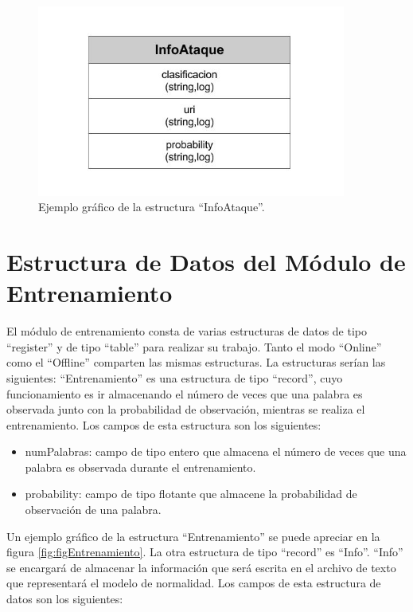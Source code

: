 \begin{figure}[!htb]
\begin{center}
\includegraphics[width=4in]{./img/InfoAtaque.jpg}
\caption{Ejemplo gráfico de la estructura ``InfoAtaque''.}
\label{fig:InfoAtaque}
\end{center}
\end{figure}	



\section{Estructura de Datos del Módulo de Entrenamiento}
El módulo de entrenamiento consta de varias estructuras de datos de
tipo ``register'' y de tipo ``table'' para realizar su trabajo. Tanto el modo
``Online'' como el ``Offline'' comparten las mismas estructuras.
La estructuras serían las siguientes:
``Entrenamiento'' es una estructura de tipo ``record'', cuyo funcionamiento es ir almacenando el número de veces que una palabra es observada junto con la probabilidad de observación, mientras se realiza el entrenamiento. Los
campos de esta estructura son los siguientes:

\begin{itemize}
\item numPalabras: campo de tipo entero que almacena el número de veces
que una palabra es observada durante el entrenamiento.
\item probability: campo de tipo flotante que almacene la probabilidad de observación de una palabra.
\end{itemize}

Un ejemplo gráfico de la estructura ``Entrenamiento'' se puede apreciar
en la figura \ref{fig:figEntrenamiento}.
La otra estructura de tipo ``record'' es ``Info''. ``Info'' se encargará de
almacenar la información que será escrita en el archivo de texto que representará el modelo de normalidad. Los campos de esta estructura de datos
son los siguientes:

